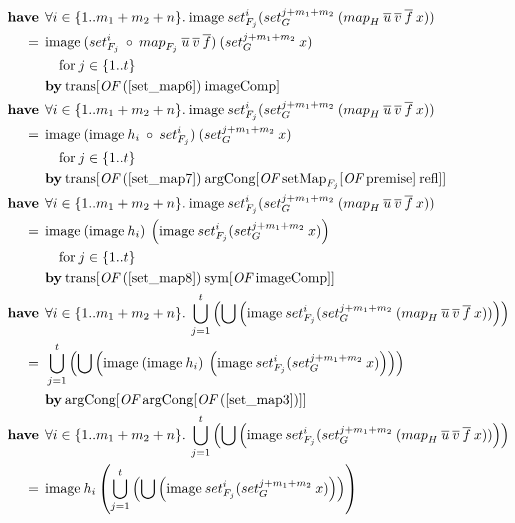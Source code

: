 \begin{align}
%
\have & \forall i \in \{1..m_1+m_2+n\}. \: \text{image} \: set_{F_j}^i (set_G^{j+m_1+m_2} \: (\map{H}{u}{v}{f} \: x)) \nonumber \\*
=\:\: & \text{image} \: (set_{F_j}^i \: \circ \: \map{F_j}{u}{v}{f}) \: (set_G^{j+m_1+m_2} \: x) \label{set_map7} \\*
 & \quad \text{for} \: j \in \{1..t\} \nonumber \\*
 & \by \OF{\text{trans}}{(\ref{set_map6}) \: \text{imageComp}} \nonumber \\
%
\have & \forall i \in \{1..m_1+m_2+n\}. \: \text{image} \: set_{F_j}^i (set_G^{j+m_1+m_2} \: (\map{H}{u}{v}{f} \: x)) \nonumber \\*
=\:\: & \text{image} \: (\text{image} \: h_i \: \circ \: set_{F_j}^i) \: (set_G^{j+m_1+m_2} \: x) \label{set_map8} \\*
 & \quad \text{for} \: j \in \{1..t\} \nonumber \\*
 & \by \OF{\text{trans}}{(\ref{set_map7}) \: \OF{\text{argCong}}{\OF{\text{setMap}_{F_j}}{\text{premise}} \: \text{refl}}} \nonumber \\
%
\have & \forall i \in \{1..m_1+m_2+n\}. \: \text{image} \: set_{F_j}^i (set_G^{j+m_1+m_2} \: (\map{H}{u}{v}{f} \: x)) \nonumber \\*
=\:\: & \text{image} \: (\text{image} \: h_i) \: \left( \text{image} \: set_{F_j}^i (set_G^{j+m_1+m_2} \: x) \right) \label{set_map3} \\*
 & \quad \text{for} \: j \in \{1..t\} \nonumber \\*
 & \by \OF{\text{trans}}{(\ref{set_map8}) \: \OF{\text{sym}}{\text{imageComp}}} \nonumber \\
%
\have & \forall i \in \{1..m_1+m_2+n\}. \: \bigcup_{j=1}^t \left( \bigcup \left( \text{image} \: set_{F_j}^i (set_G^{j+m_1+m_2} \: (\map{H}{u}{v}{f} \: x)) \right) \right) \nonumber \\*
=\:\: & \bigcup_{j=1}^t \left( \bigcup \left( \text{image} \: (\text{image} \: h_i) \: \left( \text{image} \: set_{F_j}^i (set_G^{j+m_1+m_2} \: x) \right) \right) \right) \label{set_map4} \\*
 & \by \OF{\text{argCong}}{\OF{\text{argCong}}{(\ref{set_map3})}} \nonumber \\
%
\have & \forall i \in \{1..m_1+m_2+n\}. \: \bigcup_{j=1}^t \left(\bigcup \left( \text{image} \: set_{F_j}^i (set_G^{j+m_1+m_2} \: (\map{H}{u}{v}{f} \: x)) \right) \right)\nonumber \\*
=\:\: & \text{image} \: h_i \left( \bigcup_{j=1}^t \left(\bigcup \left( \text{image} \: set_{F_j}^i (set_G^{j+m_1+m_2} \: x) \right) \right) \right) \label{set_map5} \\*

\end{align}
